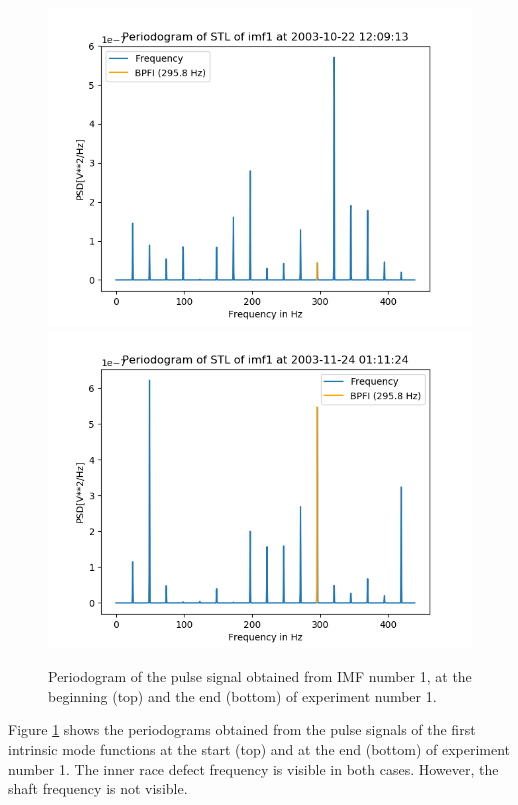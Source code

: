 \documentclass[../Main/thesis.tex]{subfiles}
\begin{document}
\begin{figure}[H]
	\centering
	\includegraphics[width=0.8\linewidth]{../fig/periodogram_bpfi/start_imf1_bpfi}
	\includegraphics[width=0.8\linewidth]{../fig/periodogram_bpfi/end_imf1_bpfi}
	\caption{Periodogram of the pulse signal obtained from IMF number 1, at the beginning (top) and the end (bottom) of experiment number 1.}
	\label{fig:startimf1bpfi}
\end{figure}
\justify
Figure \ref{fig:startimf1bpfi} shows the periodograms obtained from the pulse signals of the first intrinsic mode functions at the start (top) and at the end (bottom) of experiment number 1. The inner race defect frequency is visible in both cases.
However, the shaft frequency is not visible.
\end{document}
